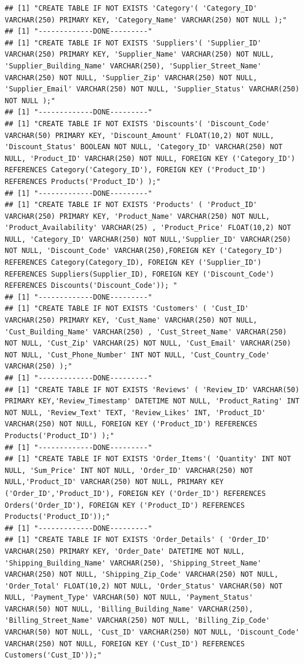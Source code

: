 \documentclass[
]{article}
\begin{document}
\begin{verbatim}
## [1] "CREATE TABLE IF NOT EXISTS 'Category'( 'Category_ID' VARCHAR(250) PRIMARY KEY, 'Category_Name' VARCHAR(250) NOT NULL );"
## [1] "-------------DONE---------"
## [1] "CREATE TABLE IF NOT EXISTS 'Suppliers'( 'Supplier_ID' VARCHAR(250) PRIMARY KEY, 'Supplier_Name' VARCHAR(250) NOT NULL, 'Supplier_Building_Name' VARCHAR(250), 'Supplier_Street_Name' VARCHAR(250) NOT NULL, 'Supplier_Zip' VARCHAR(250) NOT NULL, 'Supplier_Email' VARCHAR(250) NOT NULL, 'Supplier_Status' VARCHAR(250) NOT NULL );"
## [1] "-------------DONE---------"
## [1] "CREATE TABLE IF NOT EXISTS 'Discounts'( 'Discount_Code' VARCHAR(50) PRIMARY KEY, 'Discount_Amount' FLOAT(10,2) NOT NULL, 'Discount_Status' BOOLEAN NOT NULL, 'Category_ID' VARCHAR(250) NOT NULL, 'Product_ID' VARCHAR(250) NOT NULL, FOREIGN KEY ('Category_ID') REFERENCES Category('Category_ID'), FOREIGN KEY ('Product_ID') REFERENCES Products('Product_ID') );"
## [1] "-------------DONE---------"
## [1] "CREATE TABLE IF NOT EXISTS 'Products' ( 'Product_ID' VARCHAR(250) PRIMARY KEY, 'Product_Name' VARCHAR(250) NOT NULL, 'Product_Availability' VARCHAR(25) , 'Product_Price' FLOAT(10,2) NOT NULL, 'Category_ID' VARCHAR(250) NOT NULL,'Supplier_ID' VARCHAR(250) NOT NULL, 'Discount_Code' VARCHAR(250),FOREIGN KEY ('Category_ID') REFERENCES Category(Category_ID), FOREIGN KEY ('Supplier_ID') REFERENCES Suppliers(Supplier_ID), FOREIGN KEY ('Discount_Code') REFERENCES Discounts('Discount_Code')); "
## [1] "-------------DONE---------"
## [1] "CREATE TABLE IF NOT EXISTS 'Customers' ( 'Cust_ID' VARCHAR(250) PRIMARY KEY, 'Cust_Name' VARCHAR(250) NOT NULL, 'Cust_Building_Name' VARCHAR(250) , 'Cust_Street_Name' VARCHAR(250) NOT NULL, 'Cust_Zip' VARCHAR(25) NOT NULL, 'Cust_Email' VARCHAR(250) NOT NULL, 'Cust_Phone_Number' INT NOT NULL, 'Cust_Country_Code' VARCHAR(250) );"
## [1] "-------------DONE---------"
## [1] "CREATE TABLE IF NOT EXISTS 'Reviews' ( 'Review_ID' VARCHAR(50) PRIMARY KEY,'Review_Timestamp' DATETIME NOT NULL, 'Product_Rating' INT NOT NULL, 'Review_Text' TEXT, 'Review_Likes' INT, 'Product_ID' VARCHAR(250) NOT NULL, FOREIGN KEY ('Product_ID') REFERENCES Products('Product_ID') );"
## [1] "-------------DONE---------"
## [1] "CREATE TABLE IF NOT EXISTS 'Order_Items'( 'Quantity' INT NOT NULL, 'Sum_Price' INT NOT NULL, 'Order_ID' VARCHAR(250) NOT NULL,'Product_ID' VARCHAR(250) NOT NULL, PRIMARY KEY ('Order_ID','Product_ID'), FOREIGN KEY ('Order_ID') REFERENCES Orders('Order_ID'), FOREIGN KEY ('Product_ID') REFERENCES Products('Product_ID'));"
## [1] "-------------DONE---------"
## [1] "CREATE TABLE IF NOT EXISTS 'Order_Details' ( 'Order_ID'  VARCHAR(250) PRIMARY KEY, 'Order_Date' DATETIME NOT NULL, 'Shipping_Building_Name' VARCHAR(250), 'Shipping_Street_Name' VARCHAR(250) NOT NULL, 'Shipping_Zip_Code' VARCHAR(250) NOT NULL, 'Order_Total' FLOAT(10,2) NOT NULL, 'Order_Status' VARCHAR(50) NOT NULL, 'Payment_Type' VARCHAR(50) NOT NULL, 'Payment_Status' VARCHAR(50) NOT NULL, 'Billing_Building_Name' VARCHAR(250), 'Billing_Street_Name' VARCHAR(250) NOT NULL, 'Billing_Zip_Code' VARCHAR(50) NOT NULL, 'Cust_ID' VARCHAR(250) NOT NULL, 'Discount_Code' VARCHAR(250) NOT NULL, FOREIGN KEY ('Cust_ID') REFERENCES Customers('Cust_ID'));"

\end{verbatim}
\end{document}
